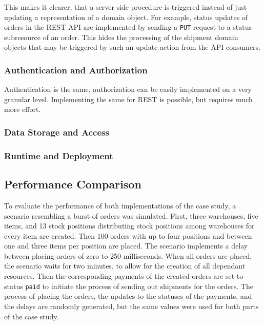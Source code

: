 This makes it clearer, that a server-side procedure is triggered instead of just updating a representation of a domain object.
For example, status updates of orders in the \ac{REST} \ac{API} are implemented by sending a \texttt{PUT} request to a status subresource of an order.
This hides the processing of the shipment domain objects that may be triggered by such an update action from the \ac{API} consumers.

\subsubsection{Authentication and Authorization}

Authentication is the same, authorization can be easily implemented on a very granular level.
Implementing the same for REST is possible, but requires much more effort.

\subsubsection{Data Storage and Access}\label{sec:comp-data}

\subsubsection{Runtime and Deployment}\label{sec:comp-runtime}

\subsection{Performance Comparison}

To evaluate the performance of both implementations of the case study, a scenario resembling a burst of orders was simulated.
First, three warehouses, five items, and 13 stock positions distributing stock positions among warehouses for every item are created.
Then 100 orders with up to four positions and between one and three items per position are placed.
The scenario implements a delay between placing orders of zero to 250 milliseconds.
When all orders are placed, the scenario waits for two minutes, to allow for the creation of all dependant resources.
Then the corresponding payments of the created orders are set to status \texttt{paid} to initiate the process of sending out shipments for the orders.
The process of placing the orders, the updates to the statuses of the payments, and the delays are randomly generated, but the same values were used for both parts of the case study.


